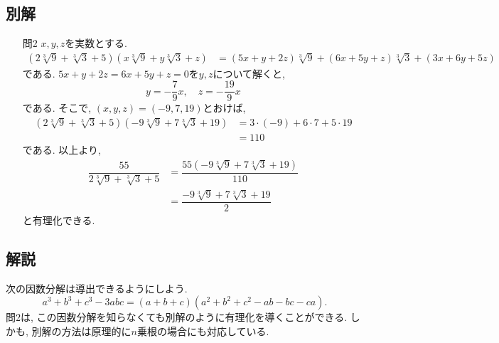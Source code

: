 \documentclass[dvipdfmx,a4paper]{jsarticle}
\newcommand{\2}{I\hspace{-1pt}I}
\newcommand{\3}{I\hspace{-1pt}I\hspace{-1pt}I}
\begin{document}
    \subsection{別解}
    \begin{itemize}
        \item [問2] $x,y,z$を実数とする. 
        \begin{align*}
            (2 \sqrt[3]{9} + \sqrt[3]{3} + 5)(x \sqrt[3]{9} + y\sqrt[3]{3} + z) 
            &= (5x+y+2z)\sqrt[3]{9} + (6x + 5y + z)\sqrt[3]{3} + (3x + 6y + 5z)
        \end{align*}
        である. $5x+y+2z=6x + 5y + z=0$を$y,z$について解くと, 
        \begin{equation*}
            y = -\dfrac{7}{9}x, \quad z = - \dfrac{19}{9}x
        \end{equation*}
        である. そこで, $(x,y,z)=(-9,7,19)$とおけば, 
        \begin{align*}
            (2 \sqrt[3]{9} + \sqrt[3]{3} + 5)(-9 \sqrt[3]{9} + 7\sqrt[3]{3} + 19) 
            &= 3\cdot (-9) + 6\cdot 7 + 5 \cdot 19 \\
            &= 110
        \end{align*}
        である. 以上より, 
        \begin{align*}
            \dfrac{55}{2 \sqrt[3]{9} + \sqrt[3]{3} + 5}
            &= \dfrac{55(-9 \sqrt[3]{9} + 7 \sqrt[3]{3} + 19)}{110} \\
            &= \dfrac{-9 \sqrt[3]{9} + 7 \sqrt[3]{3} + 19}{2}
        \end{align*}
        と有理化できる. 
    \end{itemize}



    \subsection{解説}
    次の因数分解は導出できるようにしよう. 
    \[
        a^3 + b^3 + c^3 -3abc = (a + b +c)(a^2 + b^2 + c^2 - ab -bc -ca).
    \]
    問2は, この因数分解を知らなくても別解のように有理化を導くことができる. しかも, 
    別解の方法は原理的に$n$乗根の場合にも対応している. 
    
    
\end{document}
